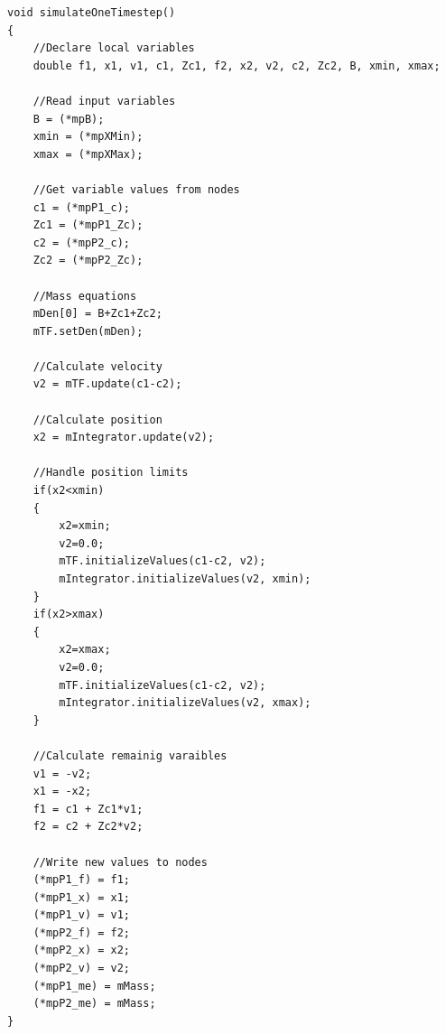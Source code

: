\documentclass[a4paper,pdftex]{article}
\begin{document}
\noindent 
\begin{minipage}{\linewidth}
\begin{lstlisting}[basicstyle=\footnotesize\ttfamily] 	
void simulateOneTimestep()
{
    //Declare local variables
    double f1, x1, v1, c1, Zc1, f2, x2, v2, c2, Zc2, B, xmin, xmax;

    //Read input variables
    B = (*mpB);
    xmin = (*mpXMin);
    xmax = (*mpXMax);
            
    //Get variable values from nodes
    c1 = (*mpP1_c);
    Zc1 = (*mpP1_Zc);
    c2 = (*mpP2_c);
    Zc2 = (*mpP2_Zc);

    //Mass equations
    mDen[0] = B+Zc1+Zc2;
    mTF.setDen(mDen);

    //Calculate velocity
    v2 = mTF.update(c1-c2);
    
    //Calculate position
    x2 = mIntegrator.update(v2);

    //Handle position limits
    if(x2<xmin)
    {
        x2=xmin;
        v2=0.0;
        mTF.initializeValues(c1-c2, v2);
        mIntegrator.initializeValues(v2, xmin);
    }
    if(x2>xmax)
    {
        x2=xmax;
        v2=0.0;
        mTF.initializeValues(c1-c2, v2);
        mIntegrator.initializeValues(v2, xmax);
    }

    //Calculate remainig varaibles
    v1 = -v2;
    x1 = -x2;
    f1 = c1 + Zc1*v1;
    f2 = c2 + Zc2*v2;

    //Write new values to nodes
    (*mpP1_f) = f1;
    (*mpP1_x) = x1;
    (*mpP1_v) = v1;
    (*mpP2_f) = f2;
    (*mpP2_x) = x2;
    (*mpP2_v) = v2;
    (*mpP1_me) = mMass;
    (*mpP2_me) = mMass;
}
\end{lstlisting}
\end{minipage}
 
\end{document}
